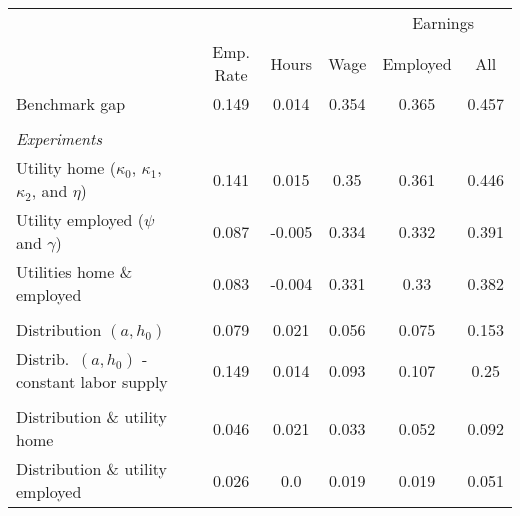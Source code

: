 \documentclass[a4paper,12pt]{article}
\newcommand{\rowgroup}[1]{\hspace{-1em}#1}
\begin{document}
 
\date{} 
\thispagestyle{empty} 
 
\begin{table}[H] 
\centering 
\begin{tabular}{llccccc} 
\hline 
\hline 
& & & & & \multicolumn{2}{c}{Earnings} \\ 
\cline{6-7} 
& & Emp. Rate &  Hours & Wage & Employed & All \\ 
\hline 
Benchmark gap & & 0.149 & 0.014 & 0.354 & 0.365 & 0.457 \\ 
\vspace{-0.2cm} \\ 
\rowgroup{\textit{Experiments}} \\ 
Utility home ($\kappa_0$, $\kappa_1$, $\kappa_2$, and $\eta$) & & 0.141 & 0.015 & 0.35 & 0.361 & 0.446 \\ 
Utility employed ($\psi$ and $\gamma$) & & 0.087 & -0.005 & 0.334 & 0.332 & 0.391 \\ 
Utilities home \& employed & & 0.083 & -0.004 & 0.331 & 0.33 & 0.382 \\ 
\vspace{-0.2cm} \\ 
Distribution $(a,h_0)$ & & 0.079 & 0.021 & 0.056 & 0.075 & 0.153 \\ 
Distrib.\ $(a,h_0)$ - constant labor supply & & 0.149 & 0.014 & 0.093 & 0.107 & 0.25 \\ 
\vspace{-0.2cm} \\ 
Distribution \& utility home & & 0.046 & 0.021 & 0.033 & 0.052 & 0.092 \\ 
Distribution \& utility employed & & 0.026 & 0.0 & 0.019 & 0.019 & 0.051 \\ 
\hline 
\hline 
\end{tabular} 
\end{table} 
\end{document}

